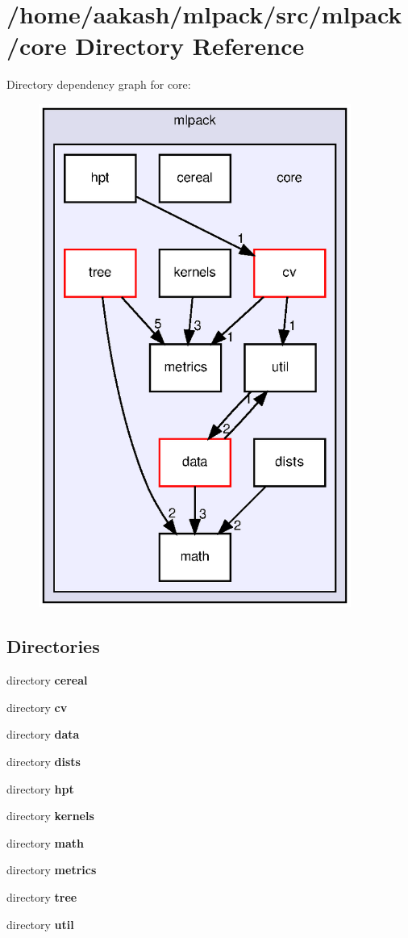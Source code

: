 \section{/home/aakash/mlpack/src/mlpack/core Directory Reference}
\label{dir_f7ac9cdfd28b2e882eb44d163e3b98b4}
Directory dependency graph for core\+:
\nopagebreak
\begin{figure}[H]
\begin{center}
\leavevmode
\includegraphics[width=290pt]{dir_f7ac9cdfd28b2e882eb44d163e3b98b4_dep}
\end{center}
\end{figure}
\subsection*{Directories}
\begin{DoxyCompactItemize}
\item 
directory \textbf{ cereal}
\item 
directory \textbf{ cv}
\item 
directory \textbf{ data}
\item 
directory \textbf{ dists}
\item 
directory \textbf{ hpt}
\item 
directory \textbf{ kernels}
\item 
directory \textbf{ math}
\item 
directory \textbf{ metrics}
\item 
directory \textbf{ tree}
\item 
directory \textbf{ util}
\end{DoxyCompactItemize}
